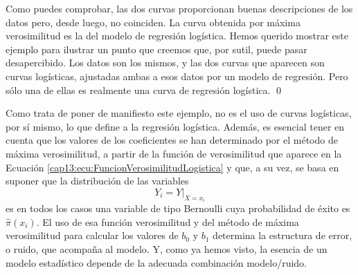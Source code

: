 \begin{ejemplo}
\begin{figure}[h!]
\begin{center}
 \label{cap13:fig:CurvaLogisticaPorDosMetodos}
\end{center}
\end{figure}
Como puedes comprobar, las dos curvas proporcionan buenas descripciones de los datos pero, desde luego, no coinciden. La curva obtenida por máxima verosimilitud es la del modelo de regresión logística. Hemos querido mostrar este ejemplo para ilustrar un punto que creemos que, por sutil, puede pasar desapercibido. Los datos son los mismos, y las dos curvas que aparecen son curvas logísticas, ajustadas ambas a esos datos por un modelo de regresión. Pero sólo una de ellas es realmente una curva de regresión logística.
\qed
\end{ejemplo}
Como trata de poner de manifiesto este ejemplo, no es el uso de curvas logísticas, por sí mismo, lo que define a la regresión logística. Además, es esencial tener en cuenta que los valores de los coeficientes se han determinado por el método de máxima verosimilitud, a partir de la función de verosimilitud que aparece en la Ecuación \ref{cap13:ecu:FuncionVerosimilitudLogistica} y que, a su vez, se basa en suponer que la distribución de las variables
\[
Y_i = Y|_{X=x_i}
\]
es en todos los casos una variable de tipo Bernoulli cuya probabilidad de éxito es $\hat{\pi}(x_i)$.  El uso de esa función verosimilitud y del  método de máxima verosimilitud para calcular los valores de $b_0$ y $b_1$ determina la estructura de error, o ruido, que acompaña al modelo. Y, como ya hemos visto, la esencia de un modelo estadístico depende de la adecuada combinación modelo/ruido.  %

